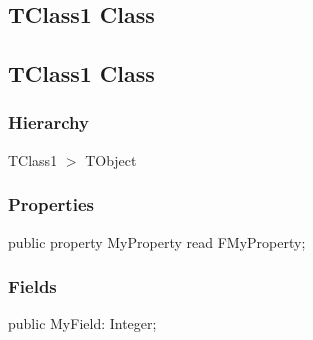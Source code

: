 \documentclass{report}
\newif\ifpdf
\begin{document}
\subsection*{\large{\textbf{TClass1 Class}}\normalsize\hspace{1ex}\hrulefill}
\else
\subsection*{TClass1 Class}
\fi
\label{ok_nodescription_printing.TClass1}
\subsubsection*{\large{\textbf{Hierarchy}}\normalsize\hspace{1ex}\hfill}
TClass1 {$>$} TObject
\subsubsection*{\large{\textbf{Properties}}\normalsize\hspace{1ex}\hfill}
\begin{list}{}{
\setlength{\itemindent}{0cm}
\setlength{\listparindent}{0cm}
\setlength{\leftmargin}{\evensidemargin}
\addtolength{\leftmargin}{\tmplength}
\settowidth{\labelsep}{X}
\addtolength{\leftmargin}{\labelsep}
\setlength{\labelwidth}{\tmplength}
}
\label{ok_nodescription_printing.TClass1-MyProperty}
\item[\textbf{MyProperty}\hfill]
\ifpdf
\begin{flushleft}
\fi
\begin{ttfamily}
public property MyProperty read FMyProperty;\end{ttfamily}

\ifpdf
\end{flushleft}
\fi


\par  \end{list}
\subsubsection*{\large{\textbf{Fields}}\normalsize\hspace{1ex}\hfill}
\begin{list}{}{
\setlength{\itemindent}{0cm}
\setlength{\listparindent}{0cm}
\setlength{\leftmargin}{\evensidemargin}
\addtolength{\leftmargin}{\tmplength}
\settowidth{\labelsep}{X}
\addtolength{\leftmargin}{\labelsep}
\setlength{\labelwidth}{\tmplength}
}
\label{ok_nodescription_printing.TClass1-MyField}
\item[\textbf{MyField}\hfill]
\ifpdf
\begin{flushleft}
\fi
\begin{ttfamily}
public MyField: Integer;\end{ttfamily}

\ifpdf
\end{flushleft}
\fi


\par  \end{list}
\end{document}
